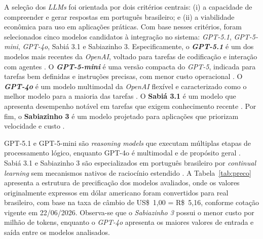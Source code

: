 \documentclass[12pt]{article}
\begin{document}
A seleção dos \textit{LLMs} foi orientada por dois critérios centrais: (i) a capacidade de compreender e gerar respostas em português brasileiro; e (ii) a viabilidade econômica para uso em aplicações práticas. Com base nesses critérios, foram selecionados cinco modelos candidatos à integração no sistema: \textit{GPT-5.1}, \textit{GPT-5-mini}, \textit{GPT-4o}, Sabiá 3.1 e Sabiazinho 3. Especificamente, o \textbf{\textit{GPT-5.1}} é um dos modelos mais recentes da \textit{OpenAI}, voltado para tarefas de codificação e interação com agentes \cite{openai-docs}. O \textbf{\textit{GPT-5-mini}} é uma versão compacta do \textit{GPT-5}, indicada para tarefas bem definidas e instruções precisas, com menor custo operacional \cite{openai-docs}. O \textbf{\textit{GPT-4o}} é um modelo multimodal da \textit{OpenAI} flexível e caracterizado como o melhor modelo para a maioria das tarefas \cite{openai-docs}. O \textbf{Sabiá 3.1} é um modelo que apresenta desempenho notável em tarefas que exigem conhecimento recente \cite{maritaca_modelos}. Por fim, o \textbf{Sabiazinho 3} é um modelo projetado para aplicações que priorizam velocidade e custo \cite{maritaca_modelos}.

GPT-5.1 e GPT-5-mini são \textit{reasoning models} que executam múltiplas etapas de processamento lógico, enquanto GPT-4o é multimodal e de propósito geral \cite{openai-docs}. Sabiá 3.1 e Sabiazinho 3 são especializados em português brasileiro por \textit{continual learning} sem mecanismos nativos de raciocínio estendido \cite{maritaca_modelos}. A Tabela~\ref{tab:preco} apresenta a estrutura de precificação dos modelos avaliados, onde os valores originalmente expressos em dólar americano foram convertidos para real brasileiro, com base na taxa de câmbio de US\$~1{,}00 = R\$~5{,}16, conforme cotação vigente em 22/06/2026. Observa-se que o \textit{Sabiazinho 3} possui o menor custo por milhão de tokens, enquanto o \textit{GPT-4o} apresenta os maiores valores de entrada e saída entre os modelos analisados. %
\end{document}
